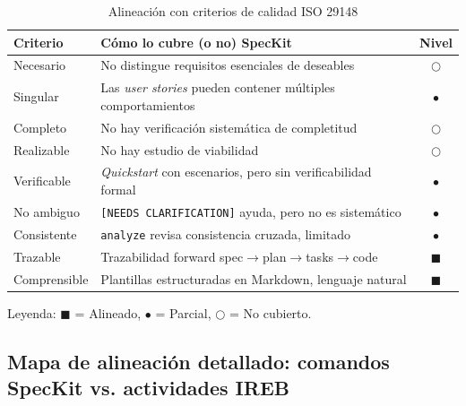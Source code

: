 \begin{table}[h]
\centering
\caption{Alineaci\'on con criterios de calidad ISO 29148}
\label{tab:calidad}
\begin{tabularx}{\textwidth}{lXc}
\toprule
\textbf{Criterio} & \textbf{C\'omo lo cubre (o no) SpecKit} & \textbf{Nivel} \\
\midrule
Necesario & No distingue requisitos esenciales de deseables & $\bigcirc$ \\
Singular & Las \emph{user stories} pueden contener m\'ultiples comportamientos & $\bullet$ \\
Completo & No hay verificaci\'on sistem\'atica de completitud & $\bigcirc$ \\
Realizable & No hay estudio de viabilidad & $\bigcirc$ \\
Verificable & \emph{Quickstart} con escenarios, pero sin verificabilidad formal & $\bullet$ \\
No ambiguo & \texttt{[NEEDS CLARIFICATION]} ayuda, pero no es sistem\'atico & $\bullet$ \\
Consistente & \texttt{analyze} revisa consistencia cruzada, limitado & $\bullet$ \\
Trazable & Trazabilidad forward spec$\rightarrow$plan$\rightarrow$tasks$\rightarrow$code & $\blacksquare$ \\
Comprensible & Plantillas estructuradas en Markdown, lenguaje natural & $\blacksquare$ \\
\bottomrule
\end{tabularx}
\end{table}

Leyenda: $\blacksquare$ = Alineado, $\bullet$ = Parcial, $\bigcirc$ = No cubierto.

\subsection{Mapa de alineaci\'on detallado: comandos SpecKit vs. actividades IREB}

